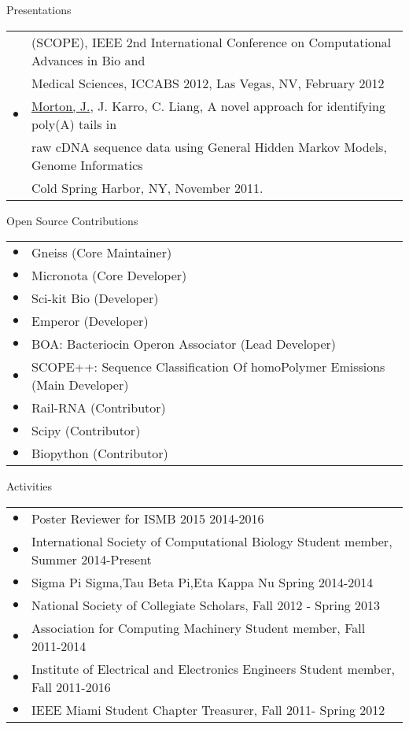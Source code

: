 \documentclass{resume} %
\begin{document}
\begin{rSection}{Presentations}
\begin{tabular}{ll}
               & (SCOPE), IEEE 2nd International Conference on Computational Advances in Bio and \\
               & Medical Sciences, ICCABS 2012, Las Vegas, NV, February 2012\\
    $\bullet$  & \underline{Morton, J.}, J. Karro, C. Liang, A novel approach for identifying poly(A) tails in \\
               & raw cDNA sequence data using General Hidden Markov Models, Genome Informatics \\
               & Cold Spring Harbor, NY, November 2011.\\
  \end{tabular}
\end{rSection}
\begin{rSection}{Open Source Contributions}
  \begin{tabular}{ll}
      $\bullet$ & Gneiss (Core Maintainer)\\
      $\bullet$ & Micronota (Core Developer)\\
      $\bullet$ & Sci-kit Bio (Developer)\\
      $\bullet$ & Emperor (Developer)\\
      $\bullet$ & BOA: Bacteriocin Operon Associator (Lead Developer)\\
      $\bullet$ & SCOPE++: Sequence Classification Of homoPolymer Emissions (Main Developer)\\
      $\bullet$ & Rail-RNA (Contributor)\\
      $\bullet$ & Scipy (Contributor)\\
      $\bullet$ & Biopython (Contributor)\\
  \end{tabular}
\end{rSection}
\begin{rSection}{Activities}
  \begin{tabular}{ll}
    $\bullet$ & Poster Reviewer for ISMB 2015  2014-2016\\
    $\bullet$ & International Society of Computational Biology Student member, Summer  2014-Present\\
    $\bullet$ & Sigma Pi Sigma,Tau Beta Pi,Eta Kappa Nu Spring 2014-2014 \\
    $\bullet$ & National Society of Collegiate Scholars, Fall 2012 - Spring 2013\\
    $\bullet$ & Association for Computing Machinery Student member, Fall  2011-2014 \\
    $\bullet$ & Institute of Electrical and Electronics Engineers Student member, Fall  2011-2016 \\
    $\bullet$ & IEEE Miami Student Chapter Treasurer, Fall 2011- Spring 2012\\
  \end{tabular}
\end{rSection}
\end{document}
